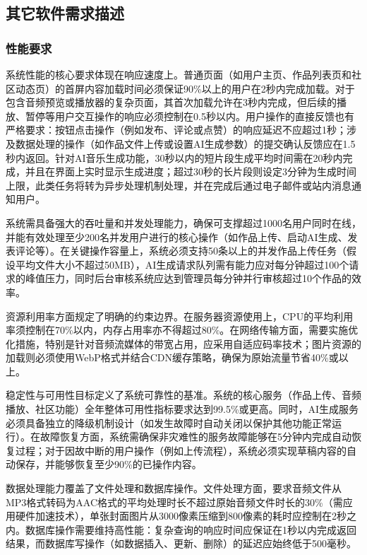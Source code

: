 \documentclass{base}
\numberwithin{figure}{section} %
\begin{document}
\subsection{其它软件需求描述}
\subsubsection{性能要求}

系统性能的核心要求体现在响应速度上。普通页面（如用户主页、作品列表页和社区动态页）的首屏内容加载时间必须保证90\%以上的用户在2秒内完成加载。对于包含音频预览或播放器的复杂页面，其首次加载允许在3秒内完成，但后续的播放、暂停等用户交互操作的响应必须控制在0.5秒以内。用户操作的直接反馈也有严格要求：按钮点击操作（例如发布、评论或点赞）的响应延迟不应超过1秒；涉及数据处理的操作（如作品文件上传或设置AI生成参数）的提交确认反馈应在1.5秒内返回。针对AI音乐生成功能，30秒以内的短片段生成平均时间需在20秒内完成，并且在界面上实时显示生成进度；超过30秒的长片段则设定3分钟为生成时间上限，此类任务将转为异步处理机制处理，并在完成后通过电子邮件或站内消息通知用户。

系统需具备强大的吞吐量和并发处理能力，确保可支撑超过1000名用户同时在线，并能有效处理至少200名并发用户进行的核心操作（如作品上传、启动AI生成、发表评论等）。在关键操作容量上，系统必须支持50条以上的并发作品上传任务（假设平均文件大小不超过50MB），AI生成请求队列需有能力应对每分钟超过100个请求的峰值压力，同时后台审核系统应达到管理员每分钟并行审核超过10个作品的效率。

资源利用率方面规定了明确的约束边界。在服务器资源使用上，CPU的平均利用率须控制在70\%以内，内存占用率亦不得超过80\%。在网络传输方面，需要实施优化措施，特别是针对音频流媒体的带宽占用，应采用自适应码率技术；图片资源的加载则必须使用WebP格式并结合CDN缓存策略，确保为原始流量节省40\%或以上。

稳定性与可用性目标定义了系统可靠性的基准。系统的核心服务（作品上传、音频播放、社区功能）全年整体可用性指标要求达到99.5\%或更高。同时，AI生成服务必须具备独立的降级机制设计（如发生故障时自动关闭以保护其他功能正常运行）。在故障恢复方面，系统需确保非灾难性的服务故障能够在5分钟内完成自动恢复过程；对于因故中断的用户操作（例如上传流程），系统必须实现草稿内容的自动保存，并能够恢复至少90\%的已操作内容。

数据处理能力覆盖了文件处理和数据库操作。文件处理方面，要求音频文件从MP3格式转码为AAC格式的平均处理时长不超过原始音频文件时长的30\%（需应用硬件加速技术），单张封面图片从3000像素压缩到800像素的耗时应控制在2秒之内。数据库操作需要维持高性能：复杂查询的响应时间应保证在1秒以内完成返回结果，而数据库写操作（如数据插入、更新、删除）的延迟应始终低于500毫秒。
\end{document}
